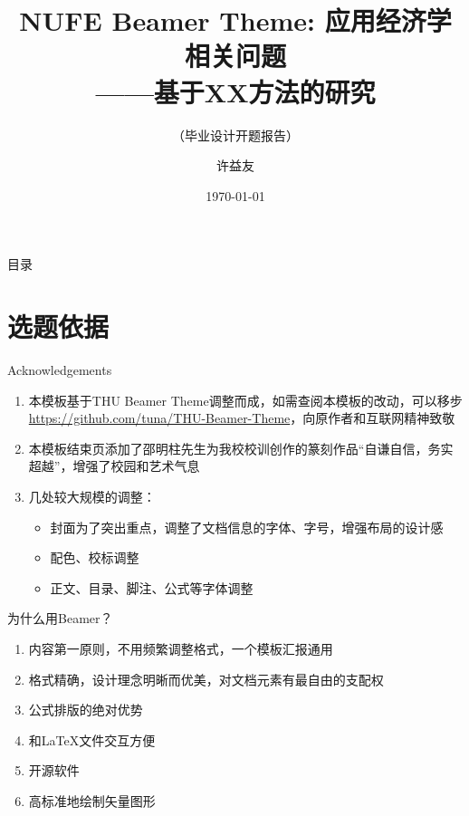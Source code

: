 \documentclass[xcolor=table,mathserif]{beamer}
\title[毕业设计开题报告]{NUFE Beamer Theme: 应用经济学相关问题\\——基于XX方法的研究}
\subtitle{（毕业设计开题报告）}
\author{许益友\vspace{-0.4cm}}
\institute{南京财经大学\enspace 粮食和物资学院\vspace{-0.4cm}}
\date{\today}
\begin{document}
\songti\rmfamily

\begin{frame}
  \titlepage
\end{frame}

\begin{frame}{目录}
    \tableofcontents
\end{frame}

\section{选题依据}
\begin{frame}{Acknowledgements}
    \begin{enumerate}
        \item 本模板基于THU Beamer Theme调整而成，如需查阅本模板的改动，可以移步\url{https://github.com/tuna/THU-Beamer-Theme}，向原作者和互联网精神致敬
        \item 本模板结束页添加了邵明柱先生为我校校训创作的篆刻作品“自谦自信，务实超越”，增强了校园和艺术气息
        \item 几处较大规模的调整：
        \begin{itemize}
            \item 封面为了突出重点，调整了文档信息的字体、字号，增强布局的设计感
            \item 配色、校标调整
            \item 正文、目录、脚注、公式等字体调整
        \end{itemize}
    \end{enumerate}
\end{frame}

\begin{frame}{为什么用Beamer？}
    \begin{enumerate}
        \item 内容第一原则，不用频繁调整格式，一个模板汇报通用
        \item 格式精确，设计理念明晰而优美，对文档元素有最自由的支配权
        \item 公式排版的绝对优势
        \item 和\LaTeX{}文件交互方便
        \item 开源软件
        \item 高标准地绘制矢量图形
    \end{enumerate}
\end{frame}
\end{document}

